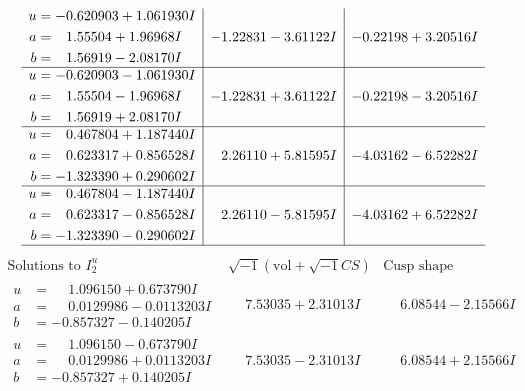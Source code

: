 \documentclass[1p]{elsarticle_modified}
\theoremstyle{definition}
\newcommand{\I}{\sqrt{-1}}
\begin{document}
$$\begin{array}{c|c|c}
\begin{aligned}
u &= -0.620903 + 1.061930 I \\
a &= \phantom{-}1.55504 + 1.96968 I \\
b &= \phantom{-}1.56919 - 2.08170 I\end{aligned}
 & -1.22831 - 3.61122 I & -0.22198 + 3.20516 I \\ \hline\begin{aligned}
u &= -0.620903 - 1.061930 I \\
a &= \phantom{-}1.55504 - 1.96968 I \\
b &= \phantom{-}1.56919 + 2.08170 I\end{aligned}
 & -1.22831 + 3.61122 I & -0.22198 - 3.20516 I \\ \hline\begin{aligned}
u &= \phantom{-}0.467804 + 1.187440 I \\
a &= \phantom{-}0.623317 + 0.856528 I \\
b &= -1.323390 + 0.290602 I\end{aligned}
 & \phantom{-}2.26110 + 5.81595 I & -4.03162 - 6.52282 I \\ \hline\begin{aligned}
u &= \phantom{-}0.467804 - 1.187440 I \\
a &= \phantom{-}0.623317 - 0.856528 I \\
b &= -1.323390 - 0.290602 I\end{aligned}
 & \phantom{-}2.26110 - 5.81595 I & -4.03162 + 6.52282 I\\
 \hline 
 \end{array}$$\newpage$$\begin{array}{c|c|c}  
\text{Solutions to }I^u_{2}& \I (\text{vol} + \sqrt{-1}CS) & \text{Cusp shape}\\
 \hline 
\begin{aligned}
u &= \phantom{-}1.096150 + 0.673790 I \\
a &= \phantom{-}0.0129986 - 0.0113203 I \\
b &= -0.857327 - 0.140205 I\end{aligned}
 & \phantom{-}7.53035 + 2.31013 I & \phantom{-}6.08544 - 2.15566 I \\ \hline\begin{aligned}
u &= \phantom{-}1.096150 - 0.673790 I \\
a &= \phantom{-}0.0129986 + 0.0113203 I \\
b &= -0.857327 + 0.140205 I\end{aligned}
 & \phantom{-}7.53035 - 2.31013 I & \phantom{-}6.08544 + 2.15566 I \\ \hline\begin{aligned}

\end{aligned}
\end{array}$$
\end{document}

